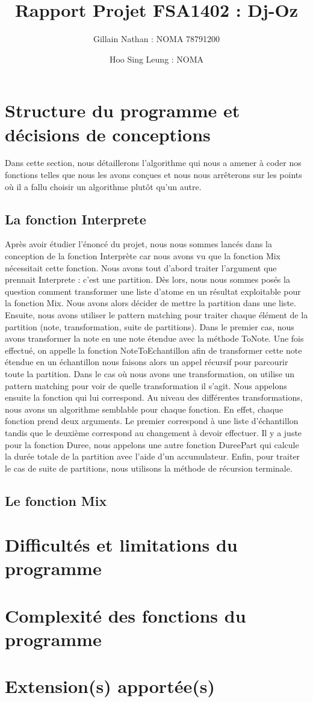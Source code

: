 \documentclass[a4paper,12pt]{article}
\title{Rapport Projet FSA1402 : Dj-Oz}
\author{Gillain Nathan : NOMA 78791200 \and Hoo Sing Leung : NOMA }
\begin{document}
\maketitle
\tableofcontents


\section{Structure du programme et décisions de conceptions}

Dans cette section, nous détaillerons l'algorithme qui nous a amener à coder nos fonctions telles que nous les avons conçues
et nous nous arrêterons sur les points où il a fallu choisir un algorithme plutôt qu'un autre.

\subsection{La fonction Interprete}

Après avoir étudier l'énoncé du projet, nous nous sommes lancés dans la conception de la fonction Interprète car nous avons vu
que la fonction Mix nécessitait cette fonction. 
Nous avons tout d'abord traiter l'argument que prennait Interprete : c'est une partition. Dès lors, nous nous sommes posés la 
question comment transformer une liste d'atome en un résultat exploitable pour la fonction Mix. Nous avons alors décider 
de mettre la partition dans une liste. Ensuite, nous avons utiliser le pattern matching pour traiter chaque élément de la 
partition (note, transformation, suite de partitions). 
Dans le premier cas, nous avons transformer la note en une note étendue avec la méthode ToNote. Une fois effectué, on appelle 
la fonction NoteToEchantillon afin de transformer cette note étendue en un échantillon nous faisons alors un appel récursif 
pour parcourir toute la partition. Dans le cas où nous avons une transformation, on utilise un pattern matching pour voir de 
quelle transformation il s'agit. Nous appelons ensuite la fonction qui lui correspond. 
Au niveau des différentes transformations, nous avons un algorithme semblable pour chaque fonction. En effet, chaque fonction 
prend deux arguments. Le premier correspond à une liste d'échantillon tandis que le deuxième correspond au changement à devoir
effectuer. Il y a juste pour la fonction Duree, nous appelons une autre fonction DureePart qui calcule la durée totale de la 
partition avec l'aide d'un accumulateur.
Enfin, pour traiter le cas de suite de partitions, nous utilisons la méthode de récursion terminale.

\subsection{Le fonction Mix}

\section{Difficultés et limitations du programme}

\section{Complexité des fonctions du programme}

\section{Extension(s) apportée(s)}
\end{document}
